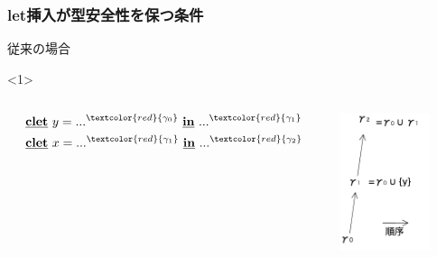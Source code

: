 \documentclass[dvipdfmx,cjk,xcolor=dvipsnames,envcountsect,notheorems,12pt]{beamer}
\newcommand\cLet{\underline{\textbf{clet}}}
\newcommand\cIn{\underline{\textbf{in}}}
\newcommand\red[1]{\textcolor{red}{#1}}
\theoremstyle{definition}
\begin{document}
\begin{frame}
  \frametitle{let挿入が型安全性を保つ条件}
  従来の場合
  \begin{onlyenv}<1>
    \begin{columns}
      \begin{column}{0.5\textwidth}%
        \begin{align*}
          &\cLet~ y = ...^{\red{\gamma_0}} ~\cIn~ ...^{\red{\gamma_1}} \\
          &\cLet~ x = ...^{\red{\gamma_1}} ~\cIn~ ...^{\red{\gamma_2}} \\
        \end{align*}
      \end{column}

      \begin{column}{0.5\textwidth}%
        \center
        \includegraphics[clip,height=4cm]{./img/normal_index.png}
      \end{column}
    \end{columns}
  \end{onlyenv}

\end{frame}
\end{document}
